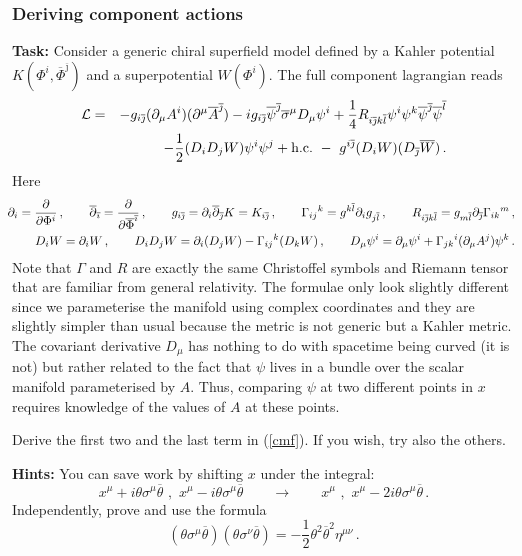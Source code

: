 \documentclass[12pt]{article}
\newcommand{\be}{\begin{equation}}
\newcommand{\ee}{\end{equation}}
\newcommand{\bea}{\begin{eqnarray}}
\newcommand{\eea}{\end{eqnarray}}
\newcommand{\ol}{\overline}
\numberwithin{equation}{section}
\begin{document}
\subsubsection{Deriving component actions}

{\bf Task:} Consider a generic chiral superfield model defined by a Kahler potential $K(\Phi^i,\ol{\Phi}^{\ol{\jmath}})$ and a superpotential $W(\Phi^i)$. The full component lagrangian reads
\bea
{\cal L} &=& -g_{i\ol{\jmath}}(\partial_\mu A^i)(\partial^\mu \ol{A}^{\ol{\jmath}})- ig_{i\ol{\jmath}} \ol{\psi}^{\ol{\jmath}}\ol{\sigma}^\mu D_\mu\psi^i +\frac{1}{4} R_{i\ol{\jmath}k\ol{l}}\psi^i\psi^k \ol{\psi}^{\ol{\jmath}} \ol{\psi}^{\ol{l}}
\nonumber \\
&& -\frac{1}{2}(D_iD_j W)\psi^i \psi^j+\mbox{h.c.}\,\,-\,\,g^{i\ol{\jmath}} (D_i W)
(D_{\ol{\jmath}} \ol{W})\,. \label{cmf}
\eea
Here 
\bea
&&\hspace*{-.5cm}\partial_i=\frac{\partial}{\partial \Phi^i}\,,\qquad 
\ol{\partial}_{\ol{\imath}}=\frac{\partial}{\partial \ol{\Phi}^{\ol{\imath}}}\,,\qquad
g_{i\ol{\jmath}}=\partial_i\ol{\partial}_{\ol{\jmath}} K=K_{i\ol{\jmath}}\,,\qquad
\Gamma_{ij}{}^k=g^{k\ol{l}}\partial_i g_{j\ol{l}}\,,\qquad
R_{i\ol{\jmath}k\ol{l}} = g_{m\ol{l}} \partial_{\ol{\jmath}} \Gamma_{ik}{}^m\,,
\nonumber\\ 
&& \hspace*{-0.8cm} D_i W=\partial_i W\,,\qquad
D_i D_j W=\partial_i(D_j W)-\Gamma_{ij}{}^k(D_k W)\,,\qquad
D_\mu \psi^i=\partial_\mu \psi^i+\Gamma_{jk}{}^i(\partial_\mu A^j)\psi^k\,.
\eea
Note that $\Gamma$ and $R$ are exactly the same Christoffel symbols and Riemann tensor that are familiar from general relativity. The formulae only look slightly different since we parameterise the manifold using complex coordinates and they are slightly simpler than usual because the metric is not generic but a Kahler metric. The covariant derivative $D_\mu$ has nothing to do with spacetime being curved (it is not) but rather related to the fact that $\psi$ lives in a bundle over the scalar manifold parameterised by $A$. Thus, comparing $\psi$ at two different points in $x$ requires knowledge of the values of $A$ at these points.

Derive the first two and the last term in (\ref{cmf}). If you wish, try also the others. 

\noindent
{\bf Hints:} You can save work by shifting $x$ under the integral:
\be
x^\mu+i\theta\sigma^\mu\ol{\theta}\,\,,\,\,x^\mu-i\theta\sigma^\mu\ol{\theta} \qquad \longrightarrow \qquad x^\mu\,\,,\,\, x^\mu-2i\theta\sigma^\mu \ol{\theta}\,.
\ee
Independently, prove and use the formula
\be
(\theta \sigma^\mu\ol{\theta}) (\theta \sigma^\nu\ol{\theta})
=-\frac{1}{2} \theta^2\ol{\theta}^2\eta^{\mu\nu}\,.\label{tef}
\ee
\end{document}

